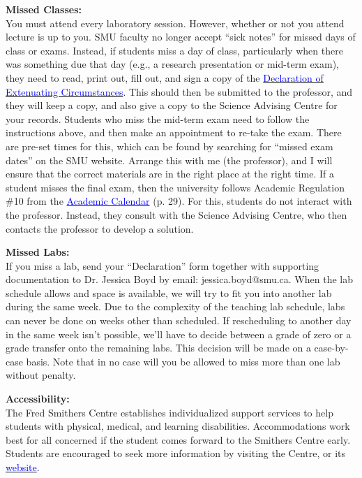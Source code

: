 \documentclass[hidelinks]{article}
\begin{document}
	\textbf{Missed Classes:}\\
	You must attend every laboratory session. However, whether or not you attend lecture is up to you. SMU faculty no longer accept ``sick notes'' for missed days of class or exams. Instead, if students miss a day of class, particularly when there was something due that day (e.g., a research presentation or mid-term exam), they need to read, print out, fill out, and sign a copy of the \href{http://www.smu.ca/webfiles/Declaration_of_Extenuating_Circumstances_withinTerm.pdf}{\textcolor{blue}{Declaration of Extenuating Circumstances}}. This should then be submitted to the professor, and they will keep a copy, and also give a copy to the Science Advising Centre for your records. Students who miss the mid-term exam need to follow the instructions above, and then make an appointment to re-take the exam. There are pre-set times for this, which can be found by searching for ``missed exam dates'' on the SMU website. Arrange this with me (the professor), and I will ensure that the correct materials are in the right place at the right time. If a student misses the final exam, then the university follows Academic Regulation \#10 from the \href{https://smu.ca/webfiles/AcademicCalendar2019-2020-Undergraduate.pdf}{\textcolor{blue}{Academic Calendar}} (p. 29). For this, students do not interact with the professor. Instead, they consult with the Science Advising Centre, who then contacts the professor to develop a solution.
	
	\textbf{Missed Labs:}\\
	If you miss a lab, send your ``Declaration'' form together with supporting documentation to Dr. Jessica Boyd by email: jessica.boyd@smu.ca. When the lab schedule allows and space is available, we will try to fit you into another lab during the same week. Due to the complexity of the teaching lab schedule, labs can never be done on weeks other than scheduled. If rescheduling to another day in the same week isn't possible, we'll have to decide between a grade of zero or a grade transfer onto the remaining labs. This decision will be made on a case-by-case basis. Note that in no case will you be allowed to miss more than one lab without penalty.


	\vspace{0.3cm}
	
	\textbf{Accessibility:}\\
	The Fred Smithers Centre establishes individualized support services to help students with physical, medical, and learning disabilities. Accommodations work best for all concerned if the student comes forward to the Smithers Centre early.  Students are encouraged to seek more information by visiting the Centre, or its \href{http://www.smu.ca/campus-life/fred-smithers-centre.html}{\textcolor{blue}{website}}.	 
\end{document}
